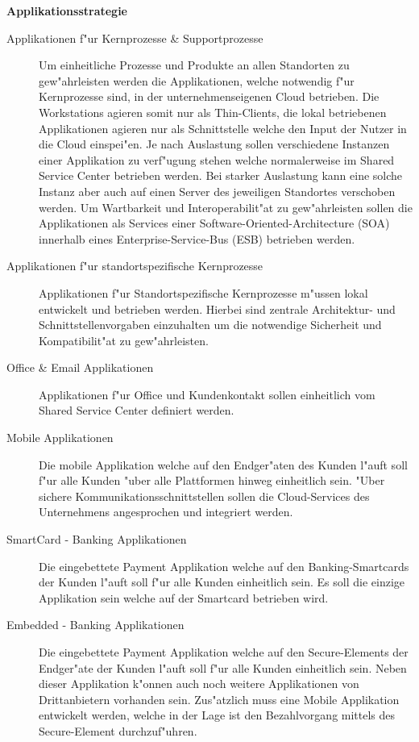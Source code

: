 \textbf{Applikationsstrategie}\\	

\begin{description}
	
	\item[Applikationen f"ur Kernprozesse \& Supportprozesse] Um einheitliche Prozesse und Produkte an allen Standorten zu gew"ahrleisten werden die Applikationen, welche notwendig f"ur Kernprozesse sind, in der unternehmenseigenen Cloud betrieben. Die Workstations agieren somit nur als Thin-Clients, die lokal betriebenen Applikationen agieren nur als Schnittstelle welche den Input der Nutzer in die Cloud einspei"en. Je nach Auslastung sollen verschiedene Instanzen einer Applikation zu verf"ugung stehen welche normalerweise im Shared Service Center betrieben werden. Bei starker Auslastung kann eine solche Instanz aber auch auf einen Server des jeweiligen Standortes verschoben werden. Um Wartbarkeit und Interoperabilit"at zu gew"ahrleisten sollen die Applikationen als Services einer Software-Oriented-Architecture (SOA) innerhalb eines Enterprise-Service-Bus (ESB) betrieben werden. 
	 
	\item[Applikationen f"ur standortspezifische Kernprozesse] Applikationen f"ur Standortspezifische Kernprozesse m"ussen lokal entwickelt und betrieben werden. Hierbei sind zentrale Architektur- und Schnittstellenvorgaben einzuhalten um die notwendige Sicherheit und Kompatibilit"at zu gew"ahrleisten. 	
	
	\item[Office \& Email Applikationen] Applikationen f"ur Office und Kundenkontakt sollen einheitlich vom Shared Service Center definiert werden.
	
	\item[Mobile Applikationen] Die mobile Applikation welche auf den Endger"aten des Kunden l"auft soll f"ur alle Kunden "uber alle Plattformen hinweg einheitlich sein. "Uber sichere Kommunikationsschnittstellen sollen die Cloud-Services des Unternehmens angesprochen und integriert werden.
	
	\item[SmartCard - Banking Applikationen] Die eingebettete Payment Applikation welche auf den Banking-Smartcards der Kunden l"auft soll f"ur alle Kunden einheitlich sein. Es soll die einzige Applikation sein welche auf der Smartcard betrieben wird.
	
	\item[Embedded - Banking Applikationen] Die eingebettete Payment Applikation welche auf den Secure-Elements der Endger"ate der Kunden l"auft soll f"ur alle Kunden einheitlich sein. Neben dieser Applikation k"onnen auch noch weitere Applikationen von Drittanbietern vorhanden sein. Zus"atzlich muss eine Mobile Applikation entwickelt werden, welche in der Lage ist den Bezahlvorgang mittels des Secure-Element durchzuf"uhren.

\end{description}

